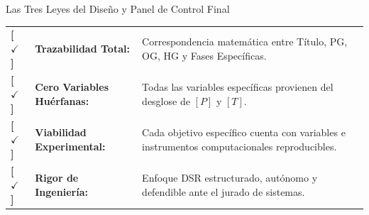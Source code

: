 \documentclass[aspectratio=169, 10pt, spanish]{beamer}
\begin{document}
\begin{frame}{Las Tres Leyes del Diseño y Panel de Control Final}
    \vspace{0.15cm}
    \begin{tcolorbox}[enhanced, colback=white, colframe=bpGreen!80!black, title=\textbf{Panel de Control de Calidad y Auditoría Académica (100\% Aprobado)}, arc=1.5mm, left=2mm, right=2mm, top=1.5mm, bottom=1.5mm]
        \tiny
        \begin{tabular}{lll}
            \color{bpGreen}\bfseries [ $\checkmark$ ] & \textbf{Trazabilidad Total:} & Correspondencia matemática entre Título, PG, OG, HG y Fases Específicas. \\
            \color{bpGreen}\bfseries [ $\checkmark$ ] & \textbf{Cero Variables Huérfanas:} & Todas las variables específicas provienen del desglose de $[P]$ y $[T]$. \\
            \color{bpGreen}\bfseries [ $\checkmark$ ] & \textbf{Viabilidad Experimental:} & Cada objetivo específico cuenta con variables e instrumentos computacionales reproducibles. \\
            \color{bpGreen}\bfseries [ $\checkmark$ ] & \textbf{Rigor de Ingeniería:} & Enfoque DSR estructurado, autónomo y defendible ante el jurado de sistemas. \\
        \end{tabular}
    \end{tcolorbox}
\end{frame}
\end{document}
